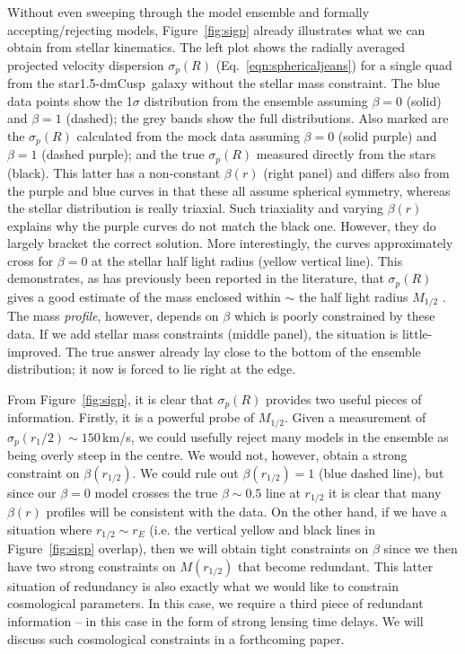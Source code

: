 \documentclass[galley,usenatbib]{mn2e}
\newcommand{\figref}[1] {Figure~\ref{#1}}
\newcommand{\eqnrefp}[1] {(Eq.~\ref{#1})}
\newcommand{\mockBC}{{\sc star1.5-dmCusp}}
\begin{document}
Without even sweeping through the model ensemble and formally
accepting/rejecting models, \figref{fig:sigp} already illustrates what we can
obtain from stellar kinematics. The left plot shows the radially averaged
projected velocity dispersion $\sigma_p(R)$ \eqnrefp{eqn:sphericaljeans} for a
single quad from the \mockBC\ galaxy without the stellar mass constraint. The
blue data points show the 1$\sigma$ distribution from the ensemble assuming
$\beta=0$ (solid) and $\beta = 1$ (dashed); the grey bands show the full
distributions. Also marked are the $\sigma_p(R)$ calculated from the mock data
assuming $\beta=0$ (solid purple) and $\beta =1$ (dashed purple); and the true
$\sigma_p(R)$ measured directly from the stars (black). This latter has a
non-constant $\beta(r)$ (right panel) and differs also from the purple and blue
curves in that these all assume spherical symmetry, whereas the stellar
distribution is really triaxial. Such triaxiality and varying $\beta(r)$
explains why the purple curves do not match the black one. However, they do
largely bracket the correct solution. More interestingly, the curves
approximately cross for $\beta = 0$ at the stellar half light radius (yellow
vertical line). This demonstrates, as has previously been reported in the
literature, that $\sigma_p(R)$ gives a good estimate of the mass enclosed
within $\sim$ the half light radius $M_{1/2}$
\citep[e.g.][]{2009ApJ...704.1274W,2010MNRAS.406.1220W}. The mass {\it
profile}, however, depends on $\beta$ which is poorly constrained by these
data. If we add stellar mass constraints (middle panel), the situation is
little-improved. The true answer already lay close to the bottom of the
ensemble distribution; it now is forced to lie right at the edge. 

From \figref{fig:sigp}, it is clear that $\sigma_p(R)$ provides two useful
pieces of information. Firstly, it is a powerful probe of $M_{1/2}$. Given a
measurement of $\sigma_p(r_1/2) \sim 150$\,km/s, we could usefully reject many
models in the ensemble as being overly steep in the centre. We would not,
however, obtain a strong constraint on $\beta(r_{1/2})$. We could rule out
$\beta(r_{1/2}) = 1$ (blue dashed line), but since our $\beta=0$ model crosses
the true $\beta \sim 0.5$ line at $r_{1/2}$ it is clear that many $\beta(r)$
profiles will be consistent with the data. On the other hand, if we have a
situation where $r_{1/2} \sim r_E$ (i.e. the vertical yellow and black lines in
\figref{fig:sigp} overlap), then we will obtain tight constraints on $\beta$
since we then have two strong constraints on $M(r_{1/2})$ that become
redundant. This latter situation of redundancy is also exactly what we would
like to constrain cosmological parameters. In this case, we require a third
piece of redundant information -- in this case in the form of strong lensing
time delays. We will discuss such cosmological constraints in a forthcoming
paper. 
\end{document}
